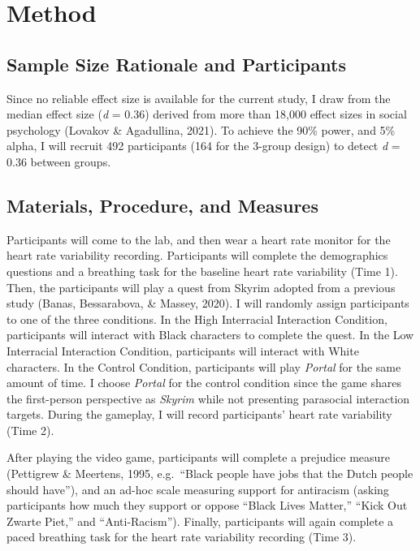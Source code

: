 \documentclass[
  english,
  man, noextraspace,floatsintext]{apa6}
\begin{document}
\hypertarget{method}{%
\section{Method}\label{method}}

\hypertarget{sample-size-rationale-and-participants}{%
\subsection{Sample Size Rationale and Participants}\label{sample-size-rationale-and-participants}}

Since no reliable effect size is available for the current study, I draw from the median effect size (\emph{d} = 0.36) derived from more than 18,000 effect sizes in social psychology (Lovakov \& Agadullina, 2021). To achieve the 90\% power, and 5\% alpha, I will recruit 492 participants (164 for the 3-group design) to detect \emph{d} = 0.36 between groups.

\hypertarget{materials-procedure-and-measures}{%
\subsection{Materials, Procedure, and Measures}\label{materials-procedure-and-measures}}

Participants will come to the lab, and then wear a heart rate monitor for the heart rate variability recording. Participants will complete the demographics questions and a breathing task for the baseline heart rate variability (Time 1). Then, the participants will play a quest from Skyrim adopted from a previous study (Banas, Bessarabova, \& Massey, 2020). I will randomly assign participants to one of the three conditions. In the High Interracial Interaction Condition, participants will interact with Black characters to complete the quest. In the Low Interracial Interaction Condition, participants will interact with White characters. In the Control Condition, participants will play \emph{Portal} for the same amount of time. I choose \emph{Portal} for the control condition since the game shares the first-person perspective as \emph{Skyrim} while not presenting parasocial interaction targets. During the gameplay, I will record participants' heart rate variability (Time 2).

After playing the video game, participants will complete a prejudice measure (Pettigrew \& Meertens, 1995, e.g.~{``Black people have jobs that the Dutch people should have''}), and an ad-hoc scale measuring support for antiracism (asking participants how much they support or oppose ``Black Lives Matter,'' ``Kick Out Zwarte Piet,'' and ``Anti-Racism''). Finally, participants will again complete a paced breathing task for the heart rate variability recording (Time 3).
\end{document}
